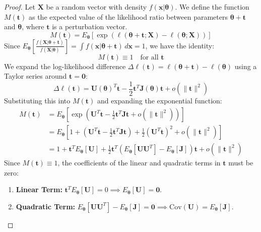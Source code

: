 \documentclass[
  letterpaper,
  DIV=11,
  numbers=noendperiod]{scrreprt}
\providecommand{\tightlist}{%
  \setlength{\itemsep}{0pt}\setlength{\parskip}{0pt}}
\renewcommand{\[}{\begin{equation}}
\renewcommand{\]}{\end{equation}}
\theoremstyle{definition}
\theoremstyle{plain}
\theoremstyle{plain}
\theoremstyle{plain}
\theoremstyle{definition}
\theoremstyle{plain}
\theoremstyle{remark}
\begin{document}
\begin{proof}
Let \(\mathbf{X}\) be a random vector with density
\(f(\mathbf{x}|\boldsymbol{\theta})\). We define the function
\(M(\mathbf{t})\) as the expected value of the likelihood ratio between
parameters \(\boldsymbol{\theta}+\mathbf{t}\) and
\(\boldsymbol{\theta}\), where \(\mathbf{t}\) is a perturbation vector.
\[
M(\mathbf{t}) = E_{\boldsymbol{\theta}} \left[ \exp\left( \ell(\boldsymbol{\theta} + \mathbf{t; X}) - \ell(\boldsymbol{\theta; X}) \right) \right]
\] Since
\(E_{\boldsymbol{\theta}} \left[ \frac{f(\mathbf{X}|\boldsymbol{\theta}+\mathbf{t})}{f(\mathbf{X}|\boldsymbol{\theta})} \right] = \int f(\mathbf{x}|\boldsymbol{\theta}+\mathbf{t}) \, d\mathbf{x} = 1\),
we have the identity: \[
M(\mathbf{t}) \equiv 1 \quad \text{for all } \mathbf{t}
\] We expand the log-likelihood difference
\(\Delta \ell(\mathbf{t}) = \ell(\boldsymbol{\theta} + \mathbf{t}) - \ell(\boldsymbol{\theta})\)
using a Taylor series around \(\mathbf{t} = \mathbf{0}\): \[
\Delta \ell(\mathbf{t}) = \mathbf{U}(\boldsymbol{\theta})^T \mathbf{t} - \frac{1}{2} \mathbf{t}^T \mathbf{J}(\boldsymbol{\theta}) \mathbf{t} + o(\|\mathbf{t}\|^2)
\] Substituting this into \(M(\mathbf{t})\) and expanding the
exponential function: \[
\begin{aligned}
M(\mathbf{t}) &= E_{\boldsymbol{\theta}} \left[ \exp\left( \mathbf{U}^T \mathbf{t} - \frac{1}{2} \mathbf{t}^T \mathbf{J} \mathbf{t} + o(\|\mathbf{t}\|^2) \right) \right] \\
&= E_{\boldsymbol{\theta}} \left[ 1 + \left( \mathbf{U}^T \mathbf{t} - \frac{1}{2} \mathbf{t}^T \mathbf{J} \mathbf{t} \right) + \frac{1}{2} \left( \mathbf{U}^T \mathbf{t} \right)^2 + o(\|\mathbf{t}\|^2) \right] \\
&= 1 + \mathbf{t}^T E_{\boldsymbol{\theta}}[\mathbf{U}] + \frac{1}{2} \mathbf{t}^T \left( E_{\boldsymbol{\theta}}[\mathbf{U}\mathbf{U}^T] - E_{\boldsymbol{\theta}}[\mathbf{J}] \right) \mathbf{t} + o(\|\mathbf{t}\|^2)
\end{aligned}
\] Since \(M(\mathbf{t}) \equiv 1\), the coefficients of the linear and
quadratic terms in \(\mathbf{t}\) must be zero:

\begin{enumerate}
\def\labelenumi{\arabic{enumi}.}
\tightlist
\item
  \textbf{Linear Term:}
  \(\mathbf{t}^T E_{\boldsymbol{\theta}}[\mathbf{U}] = 0 \implies E_{\boldsymbol{\theta}}[\mathbf{U}] = \mathbf{0}\).
\item
  \textbf{Quadratic Term:}
  \(E_{\boldsymbol{\theta}}[\mathbf{U}\mathbf{U}^T] - E_{\boldsymbol{\theta}}[\mathbf{J}] = \mathbf{0} \implies \text{Cov}(\mathbf{U}) = E_{\boldsymbol{\theta}}[\mathbf{J}]\).
\end{enumerate}

\end{proof}
\end{document}
